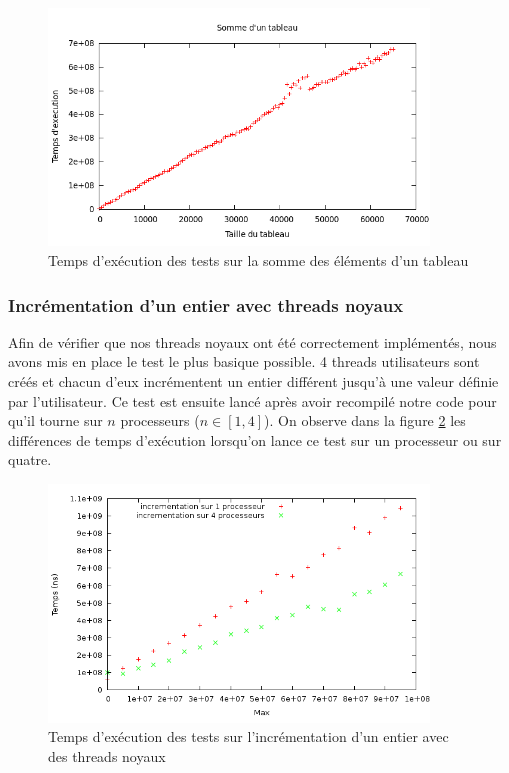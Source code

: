 \begin{figure}[H]
\centering
\includegraphics[width=0.9\textwidth]{figures/arraysum.png}
\caption{Temps d'exécution des tests sur la somme des éléments d'un tableau}
\label{fig:arraysum}
\end{figure}

\subsubsection{Incrémentation d'un entier avec threads noyaux}

Afin de vérifier que nos threads noyaux ont été correctement implémentés, nous
avons mis en place le test le plus basique possible. 4 threads utilisateurs
sont créés et chacun d'eux incrémentent un entier différent jusqu'à une valeur
définie par l'utilisateur. Ce test est ensuite lancé après avoir recompilé
notre code pour qu'il tourne sur $n$ processeurs ($n \in [1,4]$). On observe dans la
figure \ref{fig:comp-kthreads} les différences de temps d'exécution lorsqu'on
lance ce test sur un processeur ou sur quatre.

\begin{figure}[H]
\centering
\includegraphics[width=0.9\textwidth]{figures/comparatif_kthreads.png}
\caption{Temps d'exécution des tests sur l'incrémentation d'un entier avec des
  threads noyaux}
\label{fig:comp-kthreads}
\end{figure}